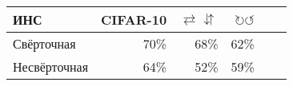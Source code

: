 \begin{tabular}{|l|r|r|r|r|r|}
\hline
ИНС & CIFAR-10 & $\rightleftarrows\downuparrows$ & $\circlearrowright\circlearrowleft$ \\
\hline
Свёрточная & 70\% & 68\% &  62\%\\ 
\hline
Несвёрточная & 64\% & 52\% & 59\% \\
\hline

\end{tabular}
